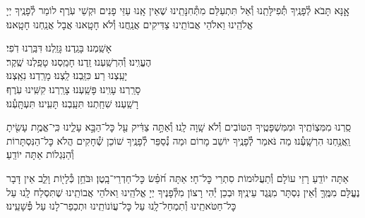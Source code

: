\documentclass[twoside, openany, parskip=half, 11pt]{book}
\begin{document}
אׇׇנָּא תָּבֹא לְ֯פָנֶֽיךָ תְּ֯פִילָּתֵֽנוּ וְ֯אַל תִּתְעַלַּם מִתְּ֯חִנָּתֵֽינוּ שֶׁאֵין אָֽנוּ עַזֵּי פָנִים וּקְשֵׁי עֹֽרֶף לוֹמַר לְ֯פָנֶֽיךָ יְיָ אֱלֹהֵֽינוּ וֵאלֹהֵי אֲבוֹתֵֽינוּ צַדִּיקִים אֲנַֽחֲנוּ וְ֯לֹא חָטָֽאנוּ אֲבָל אֲנַֽחְנוּ חָטָֽאנוּ׃

אָשַֽׁמְנוּ׃ בָּגַֽדְנוּ׃ גָּזַֽלְנוּ׃ דִּבַּֽרְנוּ דֹֽפִי׃ \\
הֶעֱוִֽינוּ׃ וְ֯הִרְשַֽׁעְנוּ׃ זַֽדְנוּ׃ חָמַֽסְנוּ׃ טָפַֽלְנוּ שֶֽׁקֶר׃\\
יָעַֽצְנוּ רַע׃ כִּזַּֽבְנוּ׃ לַֽצְנוּ׃ מָרַֽדְנוּ׃ נִאַֽצְנוּ׃ \\
סָרַֽרְנוּ׃ עָוִֽינוּ׃ פָּשַֽׁעְנוּ׃ צָרַֽרְנוּ׃ קִשִּֽׁינוּ עֹֽרֶף׃\\
רָשַֽׁעְנוּ׃ שִׁחַֽתְנוּ׃ תִּעַֽבְנוּ׃ תָּעִֽינוּ׃ תִּעְתָּֽעְ֯נוּ׃

סַֽרְנוּ מִמִּצְוֹתֶֽיךָ וּמִמִּשְׁפָּטֶֽיךָ הַטּוֹבִים וְ֯לֹא שָֽׁוָה לָֽנוּ׃ וְ֯אַתָּ֣ה צַדִּ֔יק עַ֖ל כׇּל־הַבָּ֣א עָלֵ֑ינוּ כִּֽי־אֱמֶ֥ת עָשִׂ֖יתָ וַֽאֲנַ֥חְנוּ הִרְשָֽׁעְ֯נוּ׃ מַה נֹּאמַר לְ֯פָנֶֽיךָ יוֹשֵׁב מָרוֹם וּמַה נְ֯סַפֵּר לְ֯פָנֶֽיךָ שׁוֹכֵן שְׁ֯חָקִים הֲלֹא כׇּל־הַנִּסְתָּרוֹת וְ֯הַנִּגְלוֹת אַתָּה יוֹדֵֽעַ׃

אַתָּה יוֹדֵֽעַ רָזֵי עוֹלָם וְ֯תַעֲלוּמוֹת סִתְרֵי כׇּל־חָי׃ אַתָּה חֹ֝פֵ֗שׂ כׇּל־חַדְרֵי־בָֽטֶן׃ וּבֹּחֵ֥ן כְּ֯לָי֖וֹת וָלֵ֑ב אֵין דָּבָר נֶעֱלָּם מִמֶּֽךָּ וְ֯אֵין נִסְתָּר מִנֶּֽגֶד עֵינֶֽיךָ׃ וּבְכֵן יְ֯הִי רָצוֹן מִלְּ֯פָנֶיךָ יְיָ אֱלֹהֵֽינוּ וֵאלֹהֵי אֲבוֹתֵֽינוּ שֶׁתִּסְלַח לָֽנוּ עַל כׇּל־חַטֹּאתֵֽינוּ וְ֯תִמְחַל־לָֽנוּ עַל כׇּל־עֲוֹנוֹתֵֽינוּ וּתְכַפֵר־לָנוּ עַל פְּ֯שָׁעֵֽינוּ׃
\end{document}
